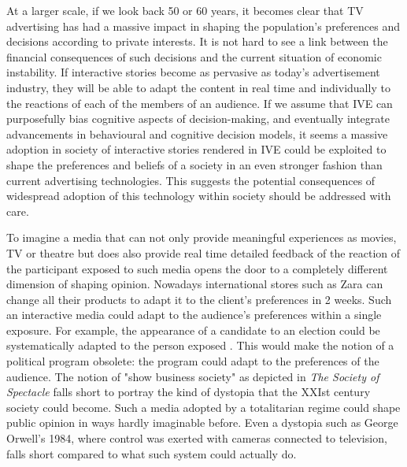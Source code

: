 \documentclass[
		twoside,openright,titlepage,numbers=noenddot,manychapters,
		headinclude,%
                footinclude=false,cleardoublepage=empty,
                BCOR=5mm,
		fontsize=11pt, %
                 enabledeprecatedfontcommands]{scrreprt}
\begin{document}


At a larger scale, if we look back 50 or 60 years, it becomes clear that TV advertising has had a massive impact in shaping the population’s preferences and decisions according to private interests. It is not hard to see a link between the financial consequences of such decisions and the current situation of economic instability. If interactive stories become as pervasive as today’s advertisement industry, they will be able to adapt the content in real time and individually to the reactions of each of the members of an audience. If we assume that IVE can purposefully bias cognitive aspects of decision-making, and eventually integrate advancements in behavioural and cognitive decision models, it seems a massive adoption in society of interactive stories rendered in IVE could be exploited to shape the preferences and beliefs of a society in an even stronger fashion than current advertising technologies. This suggests the potential consequences of widespread adoption of this technology within society should be addressed with care.





To imagine a media that can not only provide meaningful experiences as movies, TV or theatre but does also provide real time detailed feedback of the reaction of the participant exposed to such media opens the door to a completely different dimension of shaping opinion. Nowadays international stores such as Zara can change all their products to adapt it to the client's preferences in 2 weeks. Such an interactive media could adapt to the audience's preferences within a single exposure. 
For example, the appearance of a candidate to an election could be systematically adapted to the person exposed \cite[]{bailenson2008facial}. This  would make the notion of a political program obsolete: the program could adapt to the preferences of the audience. The notion of "show business society" as depicted in \emph{The Society of Spectacle} \cite[]{debord1992} falls short to portray the kind of dystopia that the XXIst century society could become. Such a media adopted by a totalitarian regime could shape public opinion in ways hardly imaginable before. Even a dystopia such as George Orwell's 1984, where control was exerted with cameras connected to television, falls short compared to what such system could actually do. 

\end{document}
